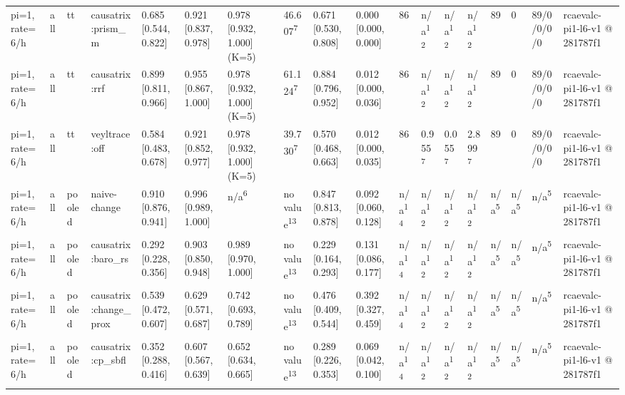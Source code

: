 \begin{table}[t]
\begin{tabular}{llllllllllllllllll}
pi=1, rate=6/h & all & tt & causatrix:prism\_m & 0.685 [0.544, 0.822] & 0.921 [0.837, 0.978] & 0.978 [0.932, 1.000] (K=5) & 46.607\textsuperscript{7} & 0.671 [0.530, 0.808] & 0.000 [0.000, 0.000] & 86 & n/a\textsuperscript{12} & n/a\textsuperscript{12} & n/a\textsuperscript{12} & 89 & 0 & 89/0/0/0/0 & rcaevalc-pi1-l6-v1 @ 281787f1 \\
pi=1, rate=6/h & all & tt & causatrix:rrf & 0.899 [0.811, 0.966] & 0.955 [0.867, 1.000] & 0.978 [0.932, 1.000] (K=5) & 61.124\textsuperscript{7} & 0.884 [0.796, 0.952] & 0.012 [0.000, 0.036] & 86 & n/a\textsuperscript{12} & n/a\textsuperscript{12} & n/a\textsuperscript{12} & 89 & 0 & 89/0/0/0/0 & rcaevalc-pi1-l6-v1 @ 281787f1 \\
pi=1, rate=6/h & all & tt & veyltrace:off & 0.584 [0.483, 0.678] & 0.921 [0.852, 0.977] & 0.978 [0.932, 1.000] (K=5) & 39.730\textsuperscript{7} & 0.570 [0.468, 0.663] & 0.012 [0.000, 0.035] & 86 & 0.955\textsuperscript{7} & 0.055\textsuperscript{7} & 2.899\textsuperscript{7} & 89 & 0 & 89/0/0/0/0 & rcaevalc-pi1-l6-v1 @ 281787f1 \\
pi=1, rate=6/h & all & pooled & naive-change & 0.910 [0.876, 0.941] & 0.996 [0.989, 1.000] & n/a\textsuperscript{6} & no value\textsuperscript{13} & 0.847 [0.813, 0.878] & 0.092 [0.060, 0.128] & n/a\textsuperscript{14} & n/a\textsuperscript{12} & n/a\textsuperscript{12} & n/a\textsuperscript{12} & n/a\textsuperscript{5} & n/a\textsuperscript{5} & n/a\textsuperscript{5} & rcaevalc-pi1-l6-v1 @ 281787f1 \\
pi=1, rate=6/h & all & pooled & causatrix:baro\_rs & 0.292 [0.228, 0.356] & 0.903 [0.850, 0.948] & 0.989 [0.970, 1.000] & no value\textsuperscript{13} & 0.229 [0.164, 0.293] & 0.131 [0.086, 0.177] & n/a\textsuperscript{14} & n/a\textsuperscript{12} & n/a\textsuperscript{12} & n/a\textsuperscript{12} & n/a\textsuperscript{5} & n/a\textsuperscript{5} & n/a\textsuperscript{5} & rcaevalc-pi1-l6-v1 @ 281787f1 \\
pi=1, rate=6/h & all & pooled & causatrix:change\_prox & 0.539 [0.472, 0.607] & 0.629 [0.571, 0.687] & 0.742 [0.693, 0.789] & no value\textsuperscript{13} & 0.476 [0.409, 0.544] & 0.392 [0.327, 0.459] & n/a\textsuperscript{14} & n/a\textsuperscript{12} & n/a\textsuperscript{12} & n/a\textsuperscript{12} & n/a\textsuperscript{5} & n/a\textsuperscript{5} & n/a\textsuperscript{5} & rcaevalc-pi1-l6-v1 @ 281787f1 \\
pi=1, rate=6/h & all & pooled & causatrix:cp\_sbfl & 0.352 [0.288, 0.416] & 0.607 [0.567, 0.639] & 0.652 [0.634, 0.665] & no value\textsuperscript{13} & 0.289 [0.226, 0.353] & 0.069 [0.042, 0.100] & n/a\textsuperscript{14} & n/a\textsuperscript{12} & n/a\textsuperscript{12} & n/a\textsuperscript{12} & n/a\textsuperscript{5} & n/a\textsuperscript{5} & n/a\textsuperscript{5} & rcaevalc-pi1-l6-v1 @ 281787f1 \\

\end{tabular}
\end{table}
